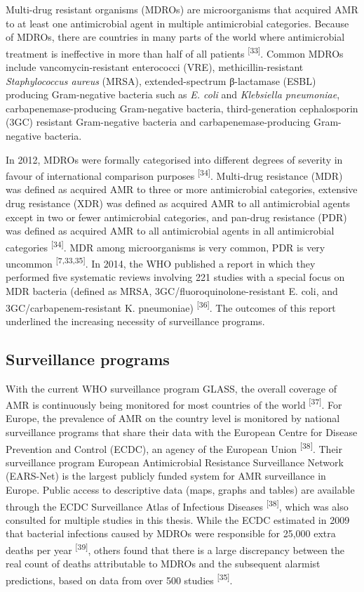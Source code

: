 \documentclass[
]{book}
\begin{document}
Multi-drug resistant organisms (MDROs) are microorganisms that acquired AMR to at least one antimicrobial agent in multiple antimicrobial categories. Because of MDROs, there are countries in many parts of the world where antimicrobial treatment is ineffective in more than half of all patients \textsuperscript{{[}33{]}}. Common MDROs include vancomycin-resistant enterococci (VRE), methicillin-resistant \emph{Staphylococcus aureus} (MRSA), extended-spectrum β-lactamase (ESBL) producing Gram-negative bacteria such as \emph{E. coli} and \emph{Klebsiella pneumoniae}, carbapenemase-producing Gram-negative bacteria, third-generation cephalosporin (3GC) resistant Gram-negative bacteria and carbapenemase-producing Gram-negative bacteria.

In 2012, MDROs were formally categorised into different degrees of severity in favour of international comparison purposes \textsuperscript{{[}34{]}}. Multi-drug resistance (MDR) was defined as acquired AMR to three or more antimicrobial categories, extensive drug resistance (XDR) was defined as acquired AMR to all antimicrobial agents except in two or fewer antimicrobial categories, and pan-drug resistance (PDR) was defined as acquired AMR to all antimicrobial agents in all antimicrobial categories \textsuperscript{{[}34{]}}. MDR among microorganisms is very common, PDR is very uncommon \textsuperscript{{[}7,33,35{]}}. In 2014, the WHO published a report in which they performed five systematic reviews involving 221 studies with a special focus on MDR bacteria (defined as MRSA, 3GC/fluoroquinolone-resistant E. coli, and 3GC/carbapenem-resistant K. pneumoniae) \textsuperscript{{[}36{]}}. The outcomes of this report underlined the increasing necessity of surveillance programs.

\hypertarget{surveillance-programs}{%
\subsection{Surveillance programs}\label{surveillance-programs}}

With the current WHO surveillance program GLASS, the overall coverage of AMR is continuously being monitored for most countries of the world \textsuperscript{{[}37{]}}. For Europe, the prevalence of AMR on the country level is monitored by national surveillance programs that share their data with the European Centre for Disease Prevention and Control (ECDC), an agency of the European Union \textsuperscript{{[}38{]}}. Their surveillance program European Antimicrobial Resistance Surveillance Network (EARS-Net) is the largest publicly funded system for AMR surveillance in Europe. Public access to descriptive data (maps, graphs and tables) are available through the ECDC Surveillance Atlas of Infectious Diseases \textsuperscript{{[}38{]}}, which was also consulted for multiple studies in this thesis. While the ECDC estimated in 2009 that bacterial infections caused by MDROs were responsible for 25,000 extra deaths per year \textsuperscript{{[}39{]}}, others found that there is a large discrepancy between the real count of deaths attributable to MDROs and the subsequent alarmist predictions, based on data from over 500 studies \textsuperscript{{[}35{]}}.
\end{document}
